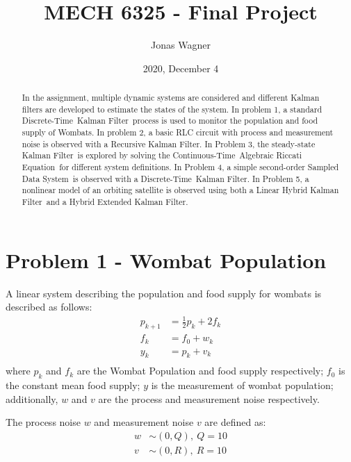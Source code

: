 \documentclass[]{article}
\title{MECH 6325 - Final Project}
\author{Jonas Wagner}
\date{2020, December 4}
\newcommand{\KF}{Kalman Filter}
\newcommand{\CT}{Continuous-Time}
\newcommand{\DT}{Discrete-Time}
\newcommand{\DTKF}{\DT \ \KF}
\newcommand{\SDS}{Sampled Data System}
\newcommand{\CARE}{\CT \ Algebraic Riccati Equation}
\begin{document}
\maketitle

\begin{abstract}
	In the assignment, multiple dynamic systems are considered and different Kalman filters are developed to estimate the states of the system. In problem 1, a standard \DTKF \ process is used to monitor the population and food supply of Wombats. In problem 2, a basic RLC circuit with process and measurement noise is observed with a Recursive \KF. In Problem 3, the steady-state \KF \ is explored by solving the \CARE \ for different system definitions. In Problem 4, a simple second-order \SDS \ is observed with a \DTKF. In Problem 5, a nonlinear model of an orbiting satellite is observed using both a Linear Hybrid \KF \ and a Hybrid Extended \KF.
\end{abstract}

\newpage

\tableofcontents
{}

\newpage
\section{Problem 1 - Wombat Population}
	
	A linear system describing the population and food supply for wombats is described as follows:
	\begin{equation}
		\begin{aligned}
			p_{k+1} &= \frac{1}{2} p_k + 2 f_k\\
			f_k		&= f_0 + w_k\\
			y_k		&= p_k + v_k\\
		\end{aligned}
	\end{equation}
	where $p_k$ and $f_k$ are the Wombat Population and food supply respectively; $f_0$ is the constant mean food supply; $y$ is the measurement of wombat population; additionally, $w$ and $v$ are the process and measurement noise respectively.
	
	The process noise $w$ and measurement noise $v$ are defined as:
	\begin{equation}
		\begin{aligned}
			w &\sim (0,Q), \ Q = 10\\
			v &\sim (0,R), \ R = 10\\
		\end{aligned}
	\end{equation}
	
\end{document}

